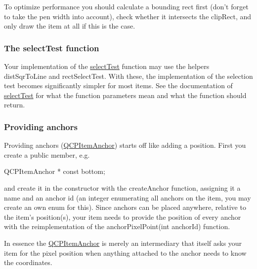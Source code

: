 \-To optimize performance you should calculate a bounding rect first (don't forget to take the pen width into account), check whether it intersects the clip\-Rect, and only draw the item at all if this is the case.\hypertarget{classQCPAbstractItem_items-selection}{}\subsubsection{\-The select\-Test function}\label{classQCPAbstractItem_items-selection}
\-Your implementation of the \hyperlink{classQCPAbstractItem_a96d522d10ffc0413b9a366c6f7f0476b}{select\-Test} function may use the helpers dist\-Sqr\-To\-Line and rect\-Select\-Test. \-With these, the implementation of the selection test becomes significantly simpler for most items. \-See the documentation of \hyperlink{classQCPAbstractItem_a96d522d10ffc0413b9a366c6f7f0476b}{select\-Test} for what the function parameters mean and what the function should return.\hypertarget{classQCPAbstractItem_anchors}{}\subsubsection{\-Providing anchors}\label{classQCPAbstractItem_anchors}
\-Providing anchors (\hyperlink{classQCPItemAnchor}{\-Q\-C\-P\-Item\-Anchor}) starts off like adding a position. \-First you create a public member, e.\-g.


\begin{DoxyCode}
 QCPItemAnchor * const bottom;
\end{DoxyCode}


and create it in the constructor with the create\-Anchor function, assigning it a name and an anchor id (an integer enumerating all anchors on the item, you may create an own enum for this). \-Since anchors can be placed anywhere, relative to the item's position(s), your item needs to provide the position of every anchor with the reimplementation of the anchor\-Pixel\-Point(int anchor\-Id) function.

\-In essence the \hyperlink{classQCPItemAnchor}{\-Q\-C\-P\-Item\-Anchor} is merely an intermediary that itself asks your item for the pixel position when anything attached to the anchor needs to know the coordinates. 

